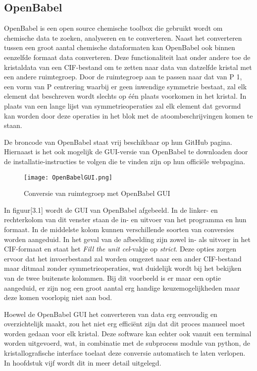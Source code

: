 \subsection{OpenBabel}
OpenBabel is een open source chemische toolbox die gebruikt wordt om chemische data te zoeken, analyseren en te converteren.\citep*{OBAB1} Naast het converteren tussen een groot aantal chemische dataformaten kan OpenBabel ook binnen eenzelfde formaat data converteren. Deze functionaliteit laat onder andere toe de kristaldata van een CIF-bestand om te zetten naar data van datzelfde kristal met een andere ruimtegroep. Door de ruimtegroep aan te passen naar dat van P 1, een vorm van P centrering waarbij er geen inwendige symmetrie bestaat, zal elk element dat beschreven wordt slechts op één plaats voorkomen in het kristal. In plaats van een lange lijst van symmetrieoperaties zal elk element dat gevormd kan worden door deze operaties in het blok met de atoombeschrijvingen komen te staan.   
\par
De broncode van OpenBabel staat vrij beschikbaar op hun GitHub pagina.  Hiernaast is het ook mogelijk de GUI-versie van OpenBabel te downloaden door de installatie-instructies te volgen die te vinden zijn op hun officiële webpagina.\citep*{OBAB1}   
\par
\begin{figure}[h]
\texttt{[image: OpenBabelGUI.png]}
\caption{Conversie van ruimtegroep met OpenBabel GUI}
\end{figure}
\par
In figuur[3.1] wordt de GUI van OpenBabel afgebeeld. In de linker- en rechterkolom van dit venster staan de in- en uitvoer van het programma en hun formaat. In de middelste kolom kunnen verschillende soorten van conversies worden aangeduid. In het geval van de afbeelding zijn zowel in- als uitvoer in het CIF-formaat en staat het \textit{Fill the unit cel}-vakje op \textit{strict}. Deze opties zorgen ervoor dat het invoerbestand zal worden omgezet naar een ander CIF-bestand maar ditmaal zonder symmetrieoperaties, wat duidelijk wordt bij het bekijken van de twee buitenste kolommen. Bij dit voorbeeld is er maar een optie aangeduid, er zijn nog een groot aantal erg handige keuzemogelijkheden maar deze komen voorlopig niet aan bod.
\par
Hoewel de OpenBabel GUI het converteren van data erg eenvoudig en overzichtelijk maakt, zou het niet erg efficiënt zijn dat dit proces manueel moet worden gedaan voor elk kristal. Deze software kan echter ook vanuit een terminal worden uitgevoerd, wat, in combinatie met de subprocess module van python, de kristallografische interface toelaat deze conversie automatisch te laten verlopen. In hoofdstuk vijf wordt dit in meer detail uitgelegd.
\par     
